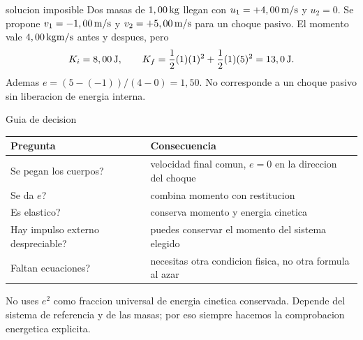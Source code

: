 \documentclass[10pt,a4paper]{article}
\begin{document}
\clearpage

\begin{examplebox}{solucion imposible}
Dos masas de $1,00\,\mathrm{kg}$ llegan con $u_1=+4,00\,\mathrm{m/s}$ y $u_2=0$. Se propone $v_1=-1,00\,\mathrm{m/s}$ y $v_2=+5,00\,\mathrm{m/s}$ para un choque pasivo.
\solutionblock El momento vale $4,00\,\mathrm{kg}\mathrm{m/s}$ antes y despues, pero
\[
K_i=8,00\,\mathrm{J},\qquad K_f=\frac12(1)(1)^2+\frac12(1)(5)^2=13,0\,\mathrm{J}.
\]
Ademas $e=(5-(-1))/(4-0)=1,50$. No corresponde a un choque pasivo sin liberacion de energia interna.
\end{examplebox}

\begin{lessoncard}{Guia de decision}
\begin{tabularx}{\linewidth}{@{}p{3.5cm}Y@{}}
\toprule
Pregunta & Consecuencia\\
\midrule
Se pegan los cuerpos? & velocidad final comun, $e=0$ en la direccion del choque\\
Se da $e$? & combina momento con restitucion\\
Es elastico? & conserva momento y energia cinetica\\
Hay impulso externo despreciable? & puedes conservar el momento del sistema elegido\\
Faltan ecuaciones? & necesitas otra condicion fisica, no otra formula al azar\\
\bottomrule
\end{tabularx}
\end{lessoncard}

\begin{warnbox}
No uses $e^2$ como fraccion universal de energia cinetica conservada. Depende del sistema de referencia y de las masas; por eso siempre hacemos la comprobacion energetica explicita.
\end{warnbox}
\end{document}
